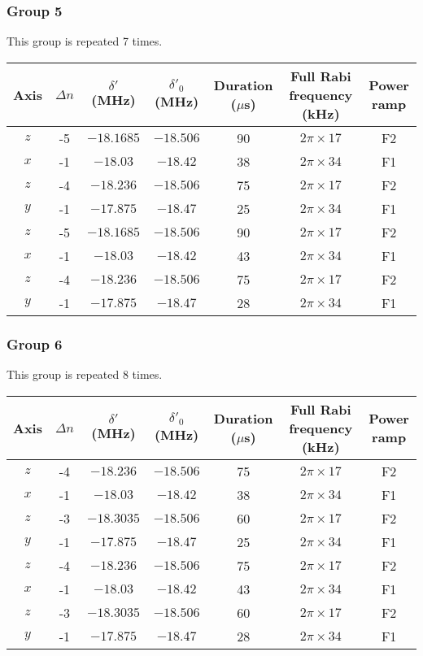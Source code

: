 \documentclass[aps,secnumarabic,amsmath,amssymb]{revtex4}
\begin{document}
\subsubsection{Group 5}
This group is repeated 7 times.
\begin{center}
  \begin{tabular}{|c|c|c|c|c|c|c|}
    \hline
    Axis&$\Delta n$&$\delta'$ (MHz)&$\delta'_0$ (MHz)&Duration ($\mu$s)&Full Rabi frequency (kHz)&Power ramp\\\hline
    $z$&-5&$-18.1685$&$-18.506$&90&$2\pi\times17$&F2\\\hline
    $x$&-1&$-18.03$&$-18.42$&38&$2\pi\times34$&F1\\\hline
    $z$&-4&$-18.236$&$-18.506$&75&$2\pi\times17$&F2\\\hline
    $y$&-1&$-17.875$&$-18.47$&25&$2\pi\times34$&F1\\\hline
    $z$&-5&$-18.1685$&$-18.506$&90&$2\pi\times17$&F2\\\hline
    $x$&-1&$-18.03$&$-18.42$&43&$2\pi\times34$&F1\\\hline
    $z$&-4&$-18.236$&$-18.506$&75&$2\pi\times17$&F2\\\hline
    $y$&-1&$-17.875$&$-18.47$&28&$2\pi\times34$&F1\\\hline
  \end{tabular}
\end{center}
\subsubsection{Group 6}
This group is repeated 8 times.
\begin{center}
  \begin{tabular}{|c|c|c|c|c|c|c|}
    \hline
    Axis&$\Delta n$&$\delta'$ (MHz)&$\delta'_0$ (MHz)&Duration ($\mu$s)&Full Rabi frequency (kHz)&Power ramp\\\hline
    $z$&-4&$-18.236$&$-18.506$&75&$2\pi\times17$&F2\\\hline
    $x$&-1&$-18.03$&$-18.42$&38&$2\pi\times34$&F1\\\hline
    $z$&-3&$-18.3035$&$-18.506$&60&$2\pi\times17$&F2\\\hline
    $y$&-1&$-17.875$&$-18.47$&25&$2\pi\times34$&F1\\\hline
    $z$&-4&$-18.236$&$-18.506$&75&$2\pi\times17$&F2\\\hline
    $x$&-1&$-18.03$&$-18.42$&43&$2\pi\times34$&F1\\\hline
    $z$&-3&$-18.3035$&$-18.506$&60&$2\pi\times17$&F2\\\hline
    $y$&-1&$-17.875$&$-18.47$&28&$2\pi\times34$&F1\\\hline
  \end{tabular}
\end{center}
\end{document}
